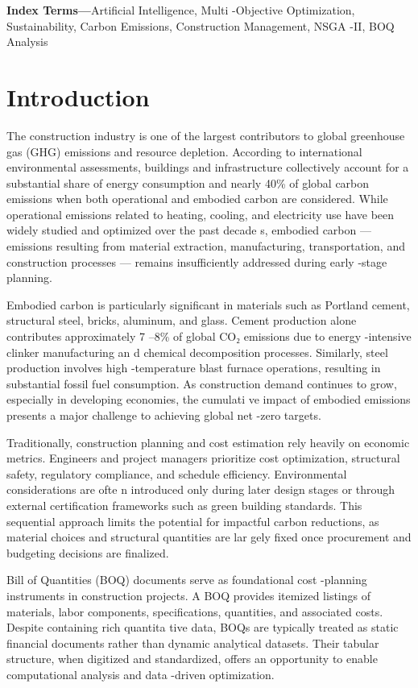 \documentclass[10pt,twocolumn]{article}
\begin{document}
\textbf{Index Terms---}Artificial Intelligence, Multi -Objective Optimization, Sustainability, Carbon Emissions,
Construction Management, NSGA -II, BOQ Analysis

\section{Introduction}
The construction industry is one of the largest contributors to global greenhouse gas (GHG)
emissions and resource depletion. According to international environmental assessments, buildings 
and infrastructure collectively account for a substantial share of  energy consumption and nearly 40\% 
of global carbon emissions when both operational and embodied carbon are considered. While 
operational emissions related to heating, cooling, and electricity use have been widely studied and 
optimized over the past decade s, embodied carbon — emissions resulting from material extraction, 
manufacturing, transportation, and construction processes — remains insufficiently addressed 
during early -stage planning.  
 
Embodied carbon is particularly significant in materials such as Portland cement, structural steel, 
bricks, aluminum, and glass. Cement production alone contributes approximately 7 –8\% of global CO₂ 
emissions due to energy -intensive clinker manufacturing an d chemical decomposition processes. 
Similarly, steel production involves high -temperature blast furnace operations, resulting in 
substantial fossil fuel consumption. As construction demand continues to grow, especially in 
developing economies, the cumulati ve impact of embodied emissions presents a major challenge to 
achieving global net -zero targets.  
 
Traditionally, construction planning and cost estimation rely heavily on economic metrics. Engineers 
and project managers prioritize cost optimization, structural safety, regulatory compliance, and 
schedule efficiency. Environmental considerations are ofte n introduced only during later design 
stages or through external certification frameworks such as green building standards. This sequential 
approach limits the potential for impactful carbon reductions, as material choices and structural 
quantities are lar gely fixed once procurement and budgeting decisions are finalized.  
 
Bill of Quantities (BOQ) documents serve as foundational cost -planning instruments in construction 
projects. A BOQ provides itemized listings of materials, labor components, specifications, quantities, 
and associated costs. Despite containing rich quantita tive data, BOQs are typically treated as static 
financial documents rather than dynamic analytical datasets. Their tabular structure, when digitized 
and standardized, offers an opportunity to enable computational analysis and data -driven 
optimization.  
 
\end{document}
